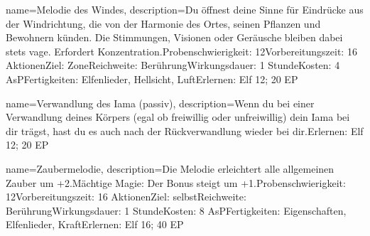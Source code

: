 {
    name={Melodie des Windes},
    description={Du öffnest deine Sinne für Eindrücke aus der Windrichtung, die von der Harmonie des Ortes, seinen Pflanzen und Bewohnern künden. Die Stimmungen, Visionen oder Geräusche bleiben dabei stets vage. Erfordert Konzentration.\newline Probenschwierigkeit: 12\newline Vorbereitungszeit: 16 Aktionen\newline Ziel: Zone\newline Reichweite: Berührung\newline Wirkungsdauer: 1 Stunde\newline Kosten: 4 AsP\newline Fertigkeiten: Elfenlieder, Hellsicht, Luft\newline Erlernen: Elf 12; 20 EP}
}


{
    name={Verwandlung des Iama (passiv)},
    description={Wenn du bei einer Verwandlung deines Körpers (egal ob freiwillig oder unfreiwillig) dein Iama bei dir trägst, hast du es auch nach der Rückverwandlung wieder bei dir.\newline Erlernen: Elf 12; 20 EP}
}


{
    name={Zaubermelodie},
    description={Die Melodie erleichtert alle allgemeinen Zauber um +2.\newline Mächtige Magie: Der Bonus steigt um +1.\newline Probenschwierigkeit: 12\newline Vorbereitungszeit: 16 Aktionen\newline Ziel: selbst\newline Reichweite: Berührung\newline Wirkungsdauer: 1 Stunde\newline Kosten: 8 AsP\newline Fertigkeiten: Eigenschaften, Elfenlieder, Kraft\newline Erlernen: Elf 16; 40 EP}
}


